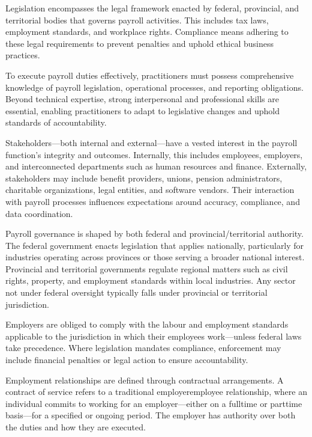 \documentclass[letterpaper,10pt,english]{sphinxmanual}
\begin{document}
\sphinxAtStartPar
Legislation encompasses the legal framework enacted by federal, provincial, and territorial bodies that governs payroll
activities. This includes tax laws, employment standards, and workplace rights. Compliance means adhering to these legal
requirements to prevent penalties and uphold ethical business practices.

\sphinxAtStartPar
To execute payroll duties effectively, practitioners must possess comprehensive knowledge of payroll legislation, operational
processes, and reporting obligations. Beyond technical expertise, strong interpersonal and professional skills are essential,
enabling practitioners to adapt to legislative changes and uphold standards of accountability.

\sphinxAtStartPar
Stakeholders—both internal and external—have a vested interest in the payroll function’s integrity and outcomes. Internally,
this includes employees, employers, and interconnected departments such as human resources and finance. Externally,
stakeholders may include benefit providers, unions, pension administrators, charitable organizations, legal entities, and
software vendors. Their interaction with payroll processes influences expectations around accuracy, compliance, and data
coordination.

\sphinxAtStartPar
Payroll governance is shaped by both federal and provincial/territorial authority. The federal government enacts legislation
that applies nationally, particularly for industries operating across provinces or those serving a broader national interest.
Provincial and territorial governments regulate regional matters such as civil rights, property, and employment standards
within local industries. Any sector not under federal oversight typically falls under provincial or territorial jurisdiction.

\sphinxAtStartPar
Employers are obliged to comply with the labour and employment standards applicable to the jurisdiction in which their
employees work—unless federal laws take precedence. Where legislation mandates compliance, enforcement may include financial
penalties or legal action to ensure accountability.

\sphinxAtStartPar
Employment relationships are defined through contractual arrangements. A contract of service refers to a traditional
employer\sphinxhyphen{}employee relationship, where an individual commits to working for an employer—either on a full\sphinxhyphen{}time or part\sphinxhyphen{}time
basis—for a specified or ongoing period. The employer has authority over both the duties and how they are executed.
\end{document}
